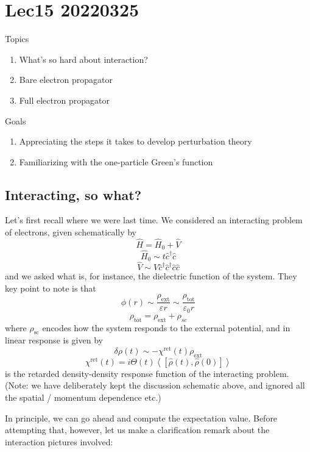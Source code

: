 \chapter{Lec15 20220325}

Topics

\begin{enumerate}
    \item What's so hard about interaction?
    \item Bare electron propagator
    \item Full electron propagator
\end{enumerate}

Goals

\begin{enumerate}
    \item Appreciating the steps it takes to develop perturbation theory
    \item Familiarizing with the one-particle Green's function
\end{enumerate}

\section{Interacting, so what?}

Let's first recall where we were last time. We considered an interacting problem of electrons, given schematically by
\[ \hat{H}=\hat{H}_0+\hat{V}\]
\[ \hat{H}_0\sim t\hat{c}^{\dagger}\hat{c}\]
\[ \hat{V}\sim V\hat{c}^{\dagger}\hat{c}^{\dagger}\hat{c}\hat{c}\]
and we asked what is, for instance, the dielectric function of the system. They key point to note is that
\[ \phi \left( r \right) \sim \frac{\rho _{\mathrm{ext}}}{\varepsilon r}\sim \frac{\rho _{\mathrm{tot}}}{\varepsilon _0r}\]
\[ \rho _{\mathrm{tot}}=\rho _{\mathrm{ext}}+\rho _{sc}\]
where $\rho_{\text{sc}}$ encodes how the system responds to the external potential, and in linear response is given by
\[ \delta \rho \left( t \right) \sim -\chi ^{\mathrm{ret}}\left( t \right) \rho _{\mathrm{ext}}\]
\[ \chi ^{\mathrm{ret}}\left( t \right) =i\Theta \left( t \right) \left< \left[ \hat{\rho}\left( t \right) ,\hat{\rho}\left( 0 \right) \right] \right> \]
is the retarded density-density response function of the interacting problem. (Note: we have deliberately kept the discussion schematic above, and ignored all the spatial / momentum dependence etc.)

In principle, we can go ahead and compute the expectation value. Before attempting that, however, let us make a clarification remark about the interaction pictures involved:

